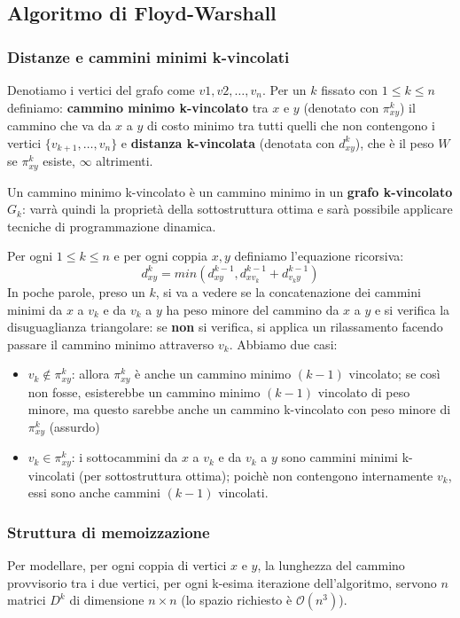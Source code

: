 \documentclass[11pt]{article}
\begin{document}
\subsection{Algoritmo di Floyd-Warshall}
\subsubsection{Distanze e cammini minimi k-vincolati}
Denotiamo i vertici del grafo come $v1,v2,\dots,v_n$. Per un $k$ fissato con $1\leq k\leq n$ definiamo: \textbf{cammino 
minimo k-vincolato} tra $x$ e $y$ (denotato con $\pi^k_{xy}$) il cammino che va da $x$ a $y$ di costo minimo tra tutti
quelli che non contengono i vertici $\{v_{k+1},\dots,v_n\}$ e \textbf{distanza k-vincolata} (denotata con $d^k_{xy}$), 
che è il peso $W$ se $\pi^k_{xy}$ esiste, $\infty$ altrimenti.

Un cammino minimo k-vincolato è un cammino minimo in un \textbf{grafo k-vincolato} $G_k$: varrà quindi la proprietà della 
sottostruttura ottima e sarà possibile applicare tecniche di programmazione dinamica. 


Per ogni $1\leq k\leq n$ e per ogni coppia $x,y$ definiamo l'equazione ricorsiva: 
\begin{equation*}
    d^k_{xy}=min(d^{k-1}_{xy}, d^{k-1}_{xv_k}+d^{k-1}_{v_ky})
\end{equation*}
In poche parole, preso un $k$, si va a vedere se la concatenazione dei cammini minimi da $x$ a $v_k$ e da $v_k$ a $y$ ha 
peso minore del cammino da $x$ a $y$ e si verifica la disuguaglianza triangolare: se \textbf{non} si verifica, si applica 
un rilassamento facendo passare il cammino minimo attraverso $v_k$.
Abbiamo due casi:
\begin{itemize}
    \item $v_k\notin\pi^k_{xy}$: allora $\pi^k_{xy}$ è anche un cammino minimo $(k-1)$ vincolato; se così non fosse, esisterebbe un 
    cammino minimo $(k-1)$ vincolato di peso minore, ma questo sarebbe anche un cammino k-vincolato con peso minore di $\pi^k_{xy}$
    (assurdo)
    \item $v_k\in\pi^k_{xy}$: i sottocammini da $x$ a $v_k$ e da $v_k$ a $y$ sono cammini minimi k-vincolati (per sottostruttura 
    ottima); poichè non contengono internamente $v_k$, essi sono anche cammini $(k-1)$ vincolati.
\end{itemize}
\subsubsection{Struttura di memoizzazione}
Per modellare, per ogni coppia di vertici $x$ e $y$, la lunghezza del cammino provvisorio tra i due vertici, per ogni 
k-esima iterazione dell'algoritmo, servono $n$ matrici $D^k$ di dimensione $n\times n$ (lo spazio richiesto è $\mathcal{O}(n^3)$). 
\end{document}
